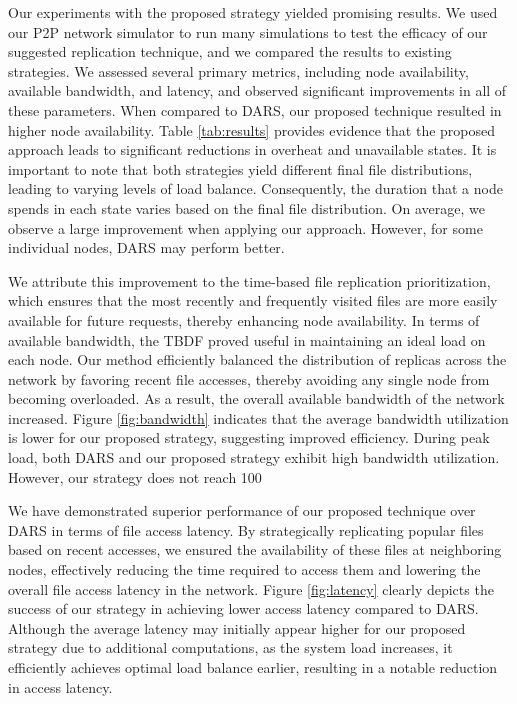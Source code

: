 \documentclass[10pt, conference]{IEEEtran}
\begin{document}
Our experiments with the proposed strategy yielded promising results. We used our P2P network simulator to run many simulations to test the efficacy of our suggested replication technique, and we compared the results to existing strategies. We assessed several primary metrics, including node availability, available bandwidth, and latency, and observed significant improvements in all of these parameters. When compared to DARS, our proposed technique resulted in higher node availability. Table \ref{tab:results} provides evidence that the proposed approach leads to significant reductions in overheat and unavailable states. It is important to note that both strategies yield different final file distributions, leading to varying levels of load balance. Consequently, the duration that a node spends in each state varies based on the final file distribution. On average, we observe a large improvement when applying our approach. However, for some individual nodes, DARS may perform better.

We attribute this improvement to the time-based file replication prioritization, which ensures that the most recently and frequently visited files are more easily available for future requests, thereby enhancing node availability. In terms of available bandwidth, the TBDF proved useful in maintaining an ideal load on each node. Our method efficiently balanced the distribution of replicas across the network by favoring recent file accesses, thereby avoiding any single node from becoming overloaded. As a result, the overall available bandwidth of the network increased. Figure \ref{fig:bandwidth} indicates that the average bandwidth utilization is lower for our proposed strategy, suggesting improved efficiency. During peak load, both DARS and our proposed strategy exhibit high bandwidth utilization. However, our strategy does not reach 100%

We have demonstrated superior performance of our proposed technique over DARS in terms of file access latency. By strategically replicating popular files based on recent accesses, we ensured the availability of these files at neighboring nodes, effectively reducing the time required to access them and lowering the overall file access latency in the network. Figure \ref{fig:latency} clearly depicts the success of our strategy in achieving lower access latency compared to DARS. Although the average latency may initially appear higher for our proposed strategy due to additional computations, as the system load increases, it efficiently achieves optimal load balance earlier, resulting in a notable reduction in access latency.
\end{document}
